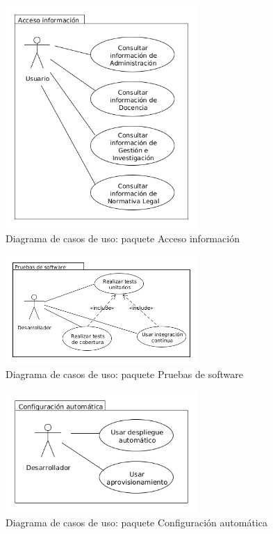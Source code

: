 \begin{figure}[!h]
  \begin{center}
  \includegraphics[width=0.65\textwidth]{imagenes/diag_cu_ai.png}
  \caption{Diagrama de casos de uso: paquete Acceso información}
  \label{fig:diag_cu_ai}
  \end{center}
\end{figure}

\begin{figure}[!h]
  \begin{center}
  \includegraphics[width=0.65\textwidth]{imagenes/diag_cu_ps.png}
  \caption{Diagrama de casos de uso: paquete Pruebas de software}
  \label{fig:diag_cu_ps}
  \end{center}
\end{figure}

\begin{figure}[!h]
  \begin{center}
  \includegraphics[width=0.65\textwidth]{imagenes/diag_cu_ca.png}
  \caption{Diagrama de casos de uso: paquete Configuración automática}
  \label{fig:diag_cu_ca}
  \end{center}
\end{figure}

